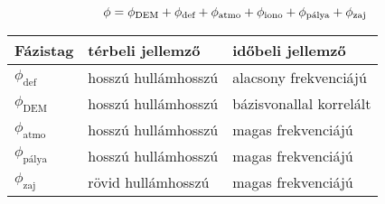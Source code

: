 \begin{frame}{\ft}
    $$ \phi = \phi_{\text{DEM}} + \phi_{\text{def}} + \phi_{\text{atmo}} + \phi_{\text{iono}} + \phi_{\text{pálya}} + \phi_{\text{zaj}} $$
    \begin{table}[H]
        \centering
        \begin{tabular}{l l l} \toprule
            Fázistag & térbeli jellemző & időbeli jellemző\\ \midrule
            $\phi_{\text{def}}$ & hosszú hullámhosszú & alacsony frekvenciájú\\
            $\phi_{\text{DEM}}$ & hosszú hullámhosszú & bázisvonallal korrelált \\
            $\phi_{\text{atmo}}$ & hosszú hullámhosszú & magas frekvenciájú\\
            $\phi_{\text{pálya}}$ & hosszú hullámhosszú & magas frekvenciájú \\
            $\phi_{\text{zaj}}$ & rövid hullámhosszú & magas frekvenciájú \\ \bottomrule
        \end{tabular}
    \end{table}
    \centering
    
    \cite{Hooper2012}
\end{frame}
